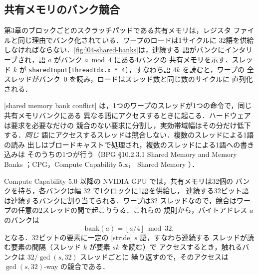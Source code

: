 \documentclass[../main.tex]{subfiles}
\begin{document}
\subsection{共有メモリのバンク競合}

第3章のブロックごとのスクラッチパッドである共有メモリは，レジスタ
ファイルと同じ理由でバンク化されている．ワープのロードは1サイクルに
32語を供給しなければならない．\cref{fig:l04-shared-banks}は，連続する
語がバンクにインタリーブされ，語 $a$ がバンク $a \bmod 4$ にある4バンクの
共有メモリを示す．スレッド $k$ が
\texttt{sharedInput[threadIdx.x * 4]}，すなわち語 $4k$ を読むと，ワープの
全スレッドがバンク~0 を読み，ロードはスレッド数と同じ数のサイクルに
直列化される．

\begin{marginfigure}
  
  \caption{語をインタリーブした4つの共有メモリバンク．4語のストライドは
    全スレッドをバンク~0 に送る．}
  \label{fig:l04-shared-banks}
\end{marginfigure}

\begin{definition}[共有メモリのバンク競合]
  \label{def:l04-smem-bank-conflict}
  [shared memory bank conflict]
  は，1つのワープのスレッドが1つの命令で，同じ共有メモリバンクにある
  異なる語にアクセスするときに起こる．ハードウェアは要求を必要なだけの
  競合のない要求に分割し，実効帯域幅はその分だけ低下する．\emph{同じ}
  語にアクセスするスレッドは競合しない．複数のスレッドによる1語の読み
  出しはブロードキャストで処理され，複数のスレッドによる1語への書き込みは
  そのうちの1つが行う（BPG §10.2.3.1 Shared Memory and Memory Banks
  \cite{nvidia2026cudabestpractices}；CPG，Compute Capability 5.x，
  Shared Memory \cite{nvidia2024cudaguide}）．
\end{definition}

Compute Capability 5.0 以降の NVIDIA GPU では，共有メモリは32個の
バンクを持ち，各バンクは幅 \SI{32}{\bit} で1クロックに1語を供給し，
連続する32ビット語は連続するバンクに割り当てられる．ワープは32
スレッドなので，競合はワープの任意の2スレッドの間で起こりうる．これらの
規則から，バイトアドレス $a$ のバンクは
\begin{equation}
  \text{bank}(a) = \left\lfloor a / 4 \right\rfloor \bmod 32,
  \label{eq:l04-bank}
\end{equation}
となる．32ビットの要素に一定の
[stride] $s$ 語，すなわち連続する
スレッドが読む要素の間隔（スレッド $k$ が要素 $sk$ を読む）で
アクセスするとき，触れるバンクは $32 / \gcd(s, 32)$ スレッドごとに
繰り返すので，そのアクセスは $\gcd(s, 32)$-way の競合である．
\end{document}
